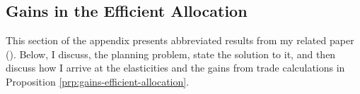 \documentclass[12pt,pdftex]{article}
\begin{document}
\begin{onehalfspacing}
%
%


\section{Gains in the Efficient Allocation}\label{apx-sec:efficient}

This section of the appendix presents abbreviated results from my related paper (\citet{waughoptimal}). Below, I discuss, the planning problem, state the solution to it, and then discuss how I arrive at the elasticities and the gains from trade calculations in Proposition \ref{prp:gains-efficient-allocation}.


\end{onehalfspacing}
\end{document}
